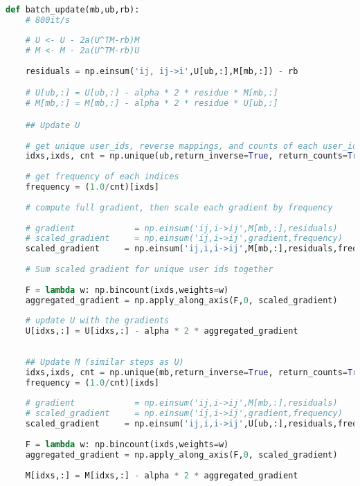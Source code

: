 \documentclass[12pt,crop=false,class=article,convert={density=300,outext=.compiled.png}]{standalone}
\begin{document}
\begin{lstlisting}[language=Python]

def batch_update(mb,ub,rb):
    # 800it/s
    
    # U <- U - 2a(U^TM-rb)M
    # M <- M - 2a(U^TM-rb)U
    
    residuals = np.einsum('ij, ij->i',U[ub,:],M[mb,:]) - rb

    # U[ub,:] = U[ub,:] - alpha * 2 * residue * M[mb,:]
    # M[mb,:] = M[mb,:] - alpha * 2 * residue * U[ub,:]

    ## Update U
    
    # get unique user_ids, reverse mappings, and counts of each user_ids
    idxs,ixds, cnt = np.unique(ub,return_inverse=True, return_counts=True)
    
    # get frequency of each indices
    frequency = (1.0/cnt)[ixds]
    
    # compute full gradient, then scale each gradient by frequency 
    
    # gradient            = np.einsum('ij,i->ij',M[mb,:],residuals)
    # scaled_gradient     = np.einsum('ij,i->ij',gradient,frequency)
    scaled_gradient     = np.einsum('ij,i,i->ij',M[mb,:],residuals,frequency)
    
    # Sum scaled gradient for unique user ids together
    
    F = lambda w: np.bincount(ixds,weights=w)
    aggregated_gradient = np.apply_along_axis(F,0, scaled_gradient)
    
    # update U with the gradients
    U[idxs,:] = U[idxs,:] - alpha * 2 * aggregated_gradient
    
    
    ## Update M (similar steps as U)
    idxs,ixds, cnt = np.unique(mb,return_inverse=True, return_counts=True)
    frequency = (1.0/cnt)[ixds]
    
    # gradient            = np.einsum('ij,i->ij',M[mb,:],residuals)
    # scaled_gradient     = np.einsum('ij,i->ij',gradient,frequency)
    scaled_gradient     = np.einsum('ij,i,i->ij',U[ub,:],residuals,frequency)
    
    F = lambda w: np.bincount(ixds,weights=w)
    aggregated_gradient = np.apply_along_axis(F,0, scaled_gradient)
    
    M[idxs,:] = M[idxs,:] - alpha * 2 * aggregated_gradient

\end{lstlisting}
\end{document}
